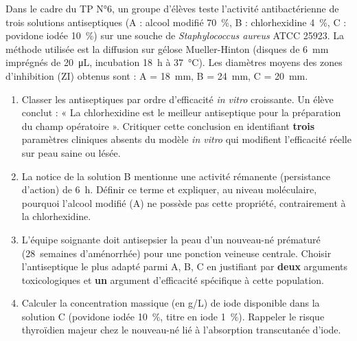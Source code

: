 \documentclass[11pt]{article}
\begin{document}
\begin{exercice}
Dans le cadre du TP N°6, un groupe d'élèves teste l'activité antibactérienne de trois solutions antiseptiques (A : alcool modifié \SI{70}{\%}, B : chlorhexidine \SI{4}{\%}, C : povidone iodée \SI{10}{\%}) sur une souche de \textit{Staphylococcus aureus} ATCC 25923. La méthode utilisée est la diffusion sur gélose Mueller-Hinton (disques de \SI{6}{\milli\meter} imprégnés de \SI{20}{\micro\liter}, incubation \SI{18}{\hour} à \SI{37}{\celsius}). Les diamètres moyens des zones d'inhibition (ZI) obtenus sont : A = \SI{18}{\milli\meter}, B = \SI{24}{\milli\meter}, C = \SI{20}{\milli\meter}.

\begin{enumerate}
    \item Classer les antiseptiques par ordre d'efficacité \textit{in vitro} croissante. Un élève conclut : « La chlorhexidine est le meilleur antiseptique pour la préparation du champ opératoire ». Critiquer cette conclusion en identifiant \textbf{trois} paramètres cliniques absents du modèle \textit{in vitro} qui modifient l'efficacité réelle sur peau saine ou lésée.
    \item La notice de la solution B mentionne une activité rémanente (persistance d'action) de \SI{6}{\hour}. Définir ce terme et expliquer, au niveau moléculaire, pourquoi l'alcool modifié (A) ne possède pas cette propriété, contrairement à la chlorhexidine.
    \item L'équipe soignante doit antisepsier la peau d'un nouveau-né prématuré (\SI{28}{semaines} d'aménorrhée) pour une ponction veineuse centrale. Choisir l'antiseptique le plus adapté parmi A, B, C en justifiant par \textbf{deux} arguments toxicologiques et \textbf{un} argument d'efficacité spécifique à cette population.
    \item Calculer la concentration massique (en g/L) de iode disponible dans la solution C (povidone iodée \SI{10}{\%}, titre en iode \SI{1}{\%}). Rappeler le risque thyroïdien majeur chez le nouveau-né lié à l'absorption transcutanée d'iode.
\end{enumerate}
\end{exercice}
\end{document}
